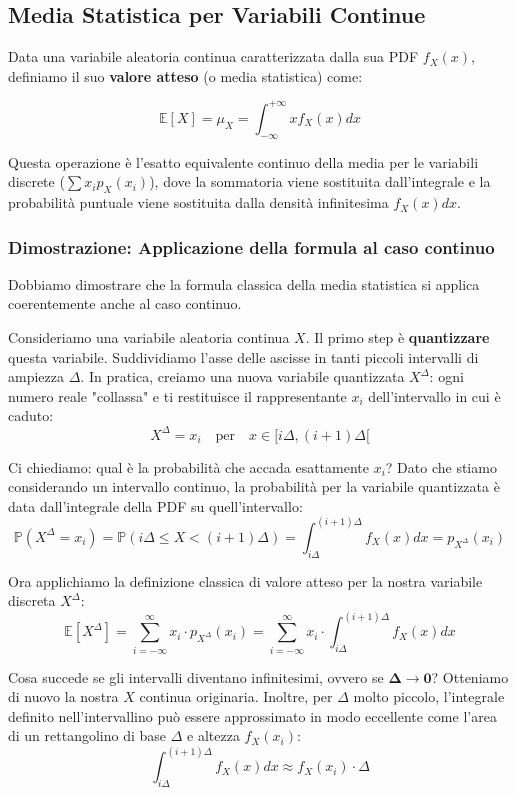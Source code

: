 \subsection{Media Statistica per Variabili Continue}

Data una variabile aleatoria continua caratterizzata dalla sua PDF $f_X(x)$, definiamo il suo \textbf{valore atteso} (o media statistica) come:

\begin{equation}
\mathbb{E}[X] = \mu_X = \int_{-\infty}^{+\infty} x f_X(x) dx
\end{equation}

Questa operazione è l'esatto equivalente continuo della media per le variabili discrete ($\sum x_i p_X(x_i)$), dove la sommatoria viene sostituita dall'integrale e la probabilità puntuale viene sostituita dalla densità infinitesima $f_X(x)dx$.

\subsubsection*{Dimostrazione: Applicazione della formula al caso continuo}

Dobbiamo dimostrare che la formula classica della media statistica si applica coerentemente anche al caso continuo.

Consideriamo una variabile aleatoria continua $X$. Il primo step è \textbf{quantizzare} questa variabile. Suddividiamo l'asse delle ascisse in tanti piccoli intervalli di ampiezza $\Delta$.
In pratica, creiamo una nuova variabile quantizzata $X^\Delta$: ogni numero reale "collassa" e ti restituisce il rappresentante $x_i$ dell'intervallo in cui è caduto:
\[
X^\Delta = x_i \quad \text{per} \quad x \in [i\Delta, (i+1)\Delta[
\]

Ci chiediamo: qual è la probabilità che accada esattamente $x_i$? Dato che stiamo considerando un intervallo continuo, la probabilità per la variabile quantizzata è data dall'integrale della PDF su quell'intervallo:
\[
\mathbb{P}(X^\Delta = x_i) = \mathbb{P}(i\Delta \le X < (i+1)\Delta) = \int_{i\Delta}^{(i+1)\Delta} f_X(x) dx = p_{X^\Delta}(x_i)
\]

Ora applichiamo la definizione classica di valore atteso per la nostra variabile discreta $X^\Delta$:
\[
\mathbb{E}[X^\Delta] = \sum_{i=-\infty}^{\infty} x_i \cdot p_{X^\Delta}(x_i) = \sum_{i=-\infty}^{\infty} x_i \cdot \int_{i\Delta}^{(i+1)\Delta} f_X(x) dx
\]

Cosa succede se gli intervalli diventano infinitesimi, ovvero se $\mathbf{\Delta \to 0}$? 
Otteniamo di nuovo la nostra $X$ continua originaria. Inoltre, per $\Delta$ molto piccolo, l'integrale definito nell'intervallino può essere approssimato in modo eccellente come l'area di un rettangolino di base $\Delta$ e altezza $f_X(x_i)$:
\[
\int_{i\Delta}^{(i+1)\Delta} f_X(x) dx \approx f_X(x_i) \cdot \Delta
\]

